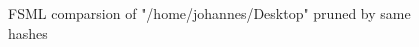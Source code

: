 \begin{figure}[tb]
\caption{\label{fig:fsml-pruned-by-samehashes} FSML comparsion of "/home/johannes/Desktop" pruned by same hashes}
\end{figure}




